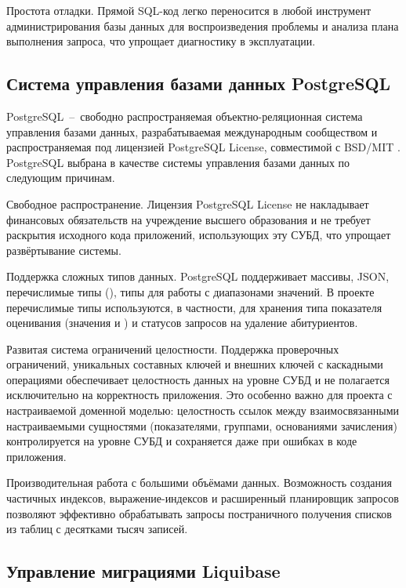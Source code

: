Простота отладки.
Прямой SQL-код легко переносится в любой инструмент администрирования базы данных для воспроизведения проблемы и анализа плана выполнения запроса, что упрощает диагностику в эксплуатации.

\subsection{Система управления базами данных PostgreSQL}

PostgreSQL~--~свободно распространяемая объектно-реляционная система управления базами данных, разрабатываемая международным сообществом и распространяемая под лицензией PostgreSQL License, совместимой с BSD/MIT .
PostgreSQL выбрана в качестве системы управления базами данных по следующим причинам.

Свободное распространение.
Лицензия PostgreSQL License не накладывает финансовых обязательств на учреждение высшего образования и не требует раскрытия исходного кода приложений, использующих эту СУБД, что упрощает развёртывание системы.

Поддержка сложных типов данных.
PostgreSQL поддерживает массивы, JSON, перечислимые типы (), типы для работы с диапазонами значений.
В проекте перечислимые типы используются, в частности, для хранения типа показателя оценивания (значения  и ) и статусов запросов на удаление абитуриентов.

Развитая система ограничений целостности.
Поддержка проверочных ограничений, уникальных составных ключей и внешних ключей с каскадными операциями обеспечивает целостность данных на уровне СУБД и не полагается исключительно на корректность приложения.
Это особенно важно для проекта с настраиваемой доменной моделью: целостность ссылок между взаимосвязанными настраиваемыми сущностями (показателями, группами, основаниями зачисления) контролируется на уровне СУБД и сохраняется даже при ошибках в коде приложения.

Производительная работа с большими объёмами данных.
Возможность создания частичных индексов, выражение-индексов и расширенный планировщик запросов позволяют эффективно обрабатывать запросы постраничного получения списков из таблиц с десятками тысяч записей.

\subsection{Управление миграциями Liquibase}


